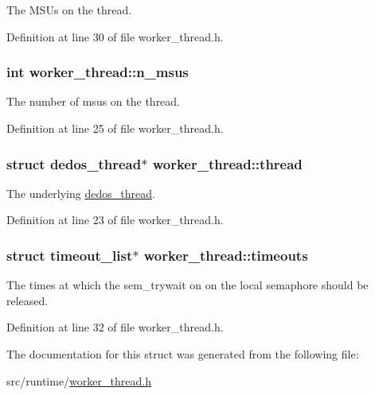 The M\-S\-Us on the thread. 



Definition at line 30 of file worker\-\_\-thread.\-h.

\hypertarget{structworker__thread_a737618048817673c66abf74b29054796}{
\subsubsection[{n\-\_\-msus}]{\setlength{\rightskip}{0pt plus 5cm}int worker\-\_\-thread\-::n\-\_\-msus}}\label{structworker__thread_a737618048817673c66abf74b29054796}


The number of msus on the thread. 



Definition at line 25 of file worker\-\_\-thread.\-h.

\hypertarget{structworker__thread_a5da2605902d4e02c6c486ed16a76a8df}{
\subsubsection[{thread}]{\setlength{\rightskip}{0pt plus 5cm}struct {\bf dedos\-\_\-thread}$\ast$ worker\-\_\-thread\-::thread}}\label{structworker__thread_a5da2605902d4e02c6c486ed16a76a8df}


The underlying \hyperlink{structdedos__thread}{dedos\-\_\-thread}. 



Definition at line 23 of file worker\-\_\-thread.\-h.

\hypertarget{structworker__thread_a1839face176d6d351d17cd9970396bad}{
\subsubsection[{timeouts}]{\setlength{\rightskip}{0pt plus 5cm}struct {\bf timeout\-\_\-list}$\ast$ worker\-\_\-thread\-::timeouts}}\label{structworker__thread_a1839face176d6d351d17cd9970396bad}


The times at which the sem\-\_\-trywait on on the local semaphore should be released. 



Definition at line 32 of file worker\-\_\-thread.\-h.



The documentation for this struct was generated from the following file\-:\begin{DoxyCompactItemize}
\item 
src/runtime/\hyperlink{worker__thread_8h}{worker\-\_\-thread.\-h}\end{DoxyCompactItemize}
